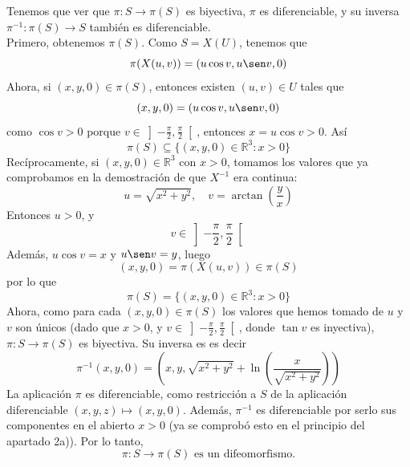 \documentclass[12pt]{article}
\newcommand{\R}{\mathbb{R}}
\begin{document}
\begin{ejercicio}
\begin{enumerate}
            Tenemos que ver que $\pi : S \to \pi(S)$ es biyectiva, $\pi$ es diferenciable, y su inversa $\pi^{-1} : \pi(S) \to S$
            también es diferenciable. \\

            Primero, obtenemos $\pi(S)$. Como $S = X(U)$, tenemos que $$\pi(X(u,v)) = (u \cos v, u \sen v, 0)$$
            Ahora, si $(x,y,0) \in \pi(S)$, entonces existen $(u,v) \in U$ tales que
            $$(x,y,0) = (u \cos v, u \sen v, 0)$$
            como $\cos v > 0$ porque $v \in \left] - \frac{\pi}{2}, \frac{\pi}{2} \right[$, entonces $x = u \cos v > 0$.
            Así $$\pi(S) \subseteq \{(x,y,0) \in \R^3 : x > 0\}$$
            Recíprocamente, si $(x,y,0) \in \R^3$ con $x >0$, tomamos los valores que ya comprobamos en la demostración 
            de que $X^{-1}$ era continua: $$u = \sqrt{x^2 + y^2}, \quad v = \arctan \left( \dfrac{y}{x} \right)$$
            Entonces $u>0$, y $$v \in \left] - \frac{\pi}{2}, \frac{\pi}{2} \right[$$
            Además, $u \cos v = x$ y $u \sen v = y$, luego
            $$(x,y,0) = \pi(X(u,v)) \in \pi(S)$$
            por lo que
            $$\pi(S) = \{(x,y,0) \in \R^3 : x > 0\}$$
            Ahora, como para cada $(x,y,0) \in \pi(S)$ los valores que hemos tomado de $u$ y $v$ son únicos
            (dado que $x > 0$, y $v \in \left]-\frac{\pi}{2}, \frac{\pi}{2} \right[$, donde $\tan v$ es inyectiva),
            $\pi : S \to \pi(S)$ es biyectiva. Su inversa es
            es decir
            $$\pi^{-1}(x,y,0) = \left(x, y, \sqrt{x^2 + y^2} + \ln \left( \dfrac{x}{\sqrt{x^2 + y^2}} \right)\right)$$
            La aplicación $\pi$ es diferenciable, como restricción a $S$ de la aplicación diferenciable $(x,y,z) \mapsto (x,y,0)$. 
            Además, $\pi^{-1}$ es diferenciable por serlo sus componentes en el abierto $x > 0$ (ya se comprobó esto en el principio
            del apartado 2a)). Por lo tanto, 
            $$\boxed{\pi : S \to \pi(S) \text{ es un difeomorfismo.}}$$
        \end{enumerate}
    \end{ejercicio}

    \newpage
\end{document}
